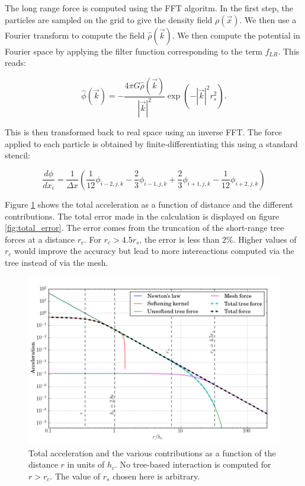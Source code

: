 \documentclass[a4paper,10pt]{report}
\begin{document}
The long range force is computed using the FFT algoritm. In the first step, the particles are sampled on the grid to give the density field $\rho(\vec{x})$. We then use a Fourier
transform to compute the field $\hat\rho(\vec{k})$. We then compute the potential in Fourier space by applying the filter function corresponding to the term $f_{LR}$. This reads:

\begin{equation}
 \hat\phi(\vec{k}) = - \frac{4\pi G\hat\rho(\vec{k})}{|\vec{k}|^2} \exp\left(-|\vec{k}|^2 r_s^2\right).
\end{equation}

This is then transformed back to real space using an inverse FFT. The force applied to each particle is obtained by finite-differentiating this using a standard stencil:

\begin{equation}
 \frac{d\phi}{dx_i} = \frac{1}{\Delta x}\left(\frac{1}{12}\phi_{i-2,j,k} - \frac{2}{3}\phi_{i-1,j,k} + \frac{2}{3}\phi_{i+1,j,k} - \frac{1}{12}\phi_{i+2,j,k}\right)
\end{equation}

Figure \ref{fig:total_force} shows the total acceleration as a function of distance and the different contributions. The total error made in the calculation is displayed on figure
\ref{fig:total_error}. The error comes from the truncation of the short-range tree forces at a distance $r_c$. For $r_c>4.5r_s$, the error is less than $2\%$. Higher values of
$r_c$ would improve the accuracy but lead to more intereactions computed via the tree instead of via the mesh.\\

\begin{figure}
\centering
\includegraphics[width=\textwidth]{Figures/Gravity/force}
\caption{Total acceleration and the various contributions as a function of the distance $r$ in units of $h_c$. No tree-based interaction is computed for $r>r_c$.
The value of $r_s$ chosen here is arbitrary.} 
 \label{fig:total_force}
\end{figure}
\end{document}
